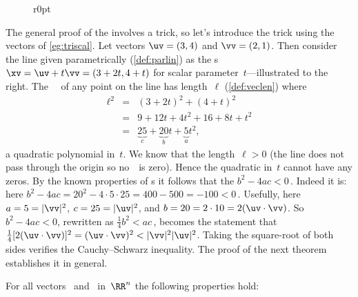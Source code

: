 \begin{wrapfigure}r{0pt}
\end{wrapfigure}
\begin{example} 
The general proof of the  involves a trick, so let's introduce the trick using the vectors of \cref{eg:triscal}.
Let vectors \(\uv=(3,4)\) and \(\vv=(2,1)\).
Then consider the line given parametrically (\cref{def:parlin}) as the s \(\xv=\uv+t\vv=(3+2t,4+t)\) for scalar parameter~\(t\)---illustrated to the right.
The ~\xv\ of any point on the line has length~\(\ell\) (\cref{def:veclen}) where
\begin{eqnarray*}
\ell^2&=&(3+2t)^2+(4+t)^2
\\&=&9+12t+4t^2+16+8t+t^2
\\&=&\underbrace{25}_{c}+\underbrace{20}_{b}t+\underbrace{5}_{a}t^2,
\end{eqnarray*}
a quadratic polynomial in~\(t\).
We know that the length~\(\ell>0\)  (the line does not pass through the origin so no~\xv\ is zero).
Hence the quadratic in~\(t\) cannot have any zeros.
By the known properties of s it follows that the  \(b^2-4ac<0\)\,.
Indeed it is: here \(b^2-4ac=20^2-4\cdot5\cdot25=400-500=-100<0\)\,.
Usefully, here \(a=5=|\vv|^2\), \(c=25=|\uv|^2\), and \(b=20=2\cdot10=2(\uv\cdot\vv)\).
So \(b^2-4ac<0\), rewritten as \(\tfrac14b^2<ac\)\,, becomes the statement that \(\tfrac14[2(\uv\cdot\vv)]^2=(\uv\cdot\vv)^2<|\vv|^2|\uv|^2\).
Taking the square-root of both sides verifies the Cauchy--Schwarz inequality.  
The proof of the next theorem establishes it in general.
\end{example}






\begin{theorem} \label{thm:triscal}
For all vectors \uv\ and \vv\ in~\(\RR^n\) the following properties hold:
\end{theorem}


